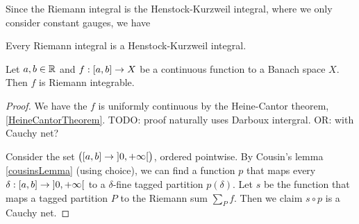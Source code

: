 Since the Riemann integral is the Henstock-Kurzweil integral, where we only consider constant gauges, we have
\begin{lemma}
Every Riemann integral is a Henstock-Kurzweil integral.
\end{lemma}


\begin{proposition} \label{continuousFunctionOnIntervalRiemannIntegrable}
Let $a,b\in \mathbb{R}$ and $f:\interval{a,b}\to X$ be a continuous function to a Banach space $X$. Then $f$ is Riemann integrable.
\end{proposition}
\begin{proof}
We have the $f$ is uniformly continuous by the Heine-Cantor theorem, \ref{HeineCantorTheorem}. TODO: proof naturally uses Darboux intergral. OR: with Cauchy net?



Consider the set $\big(\interval{a,b}\to \interval[o]{0,+\infty}\big)$, ordered pointwise. By Cousin's lemma \ref{cousinsLemma} (using choice), we can find a function $p$ that maps every $\delta: \interval{a,b}\to \interval[o]{0,+\infty}$ to a $\delta$-fine tagged partition $p(\delta)$. Let $s$ be the function that maps a tagged partition $P$ to the Riemann sum $\sum_P f$. Then we claim $s\circ p$ is a Cauchy net.
\end{proof}



